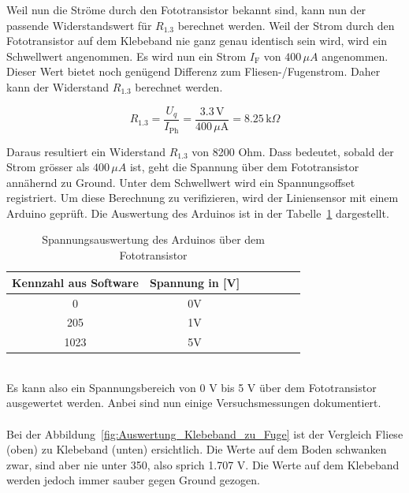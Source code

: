 \documentclass[main.tex]{subfiles} %
\begin{document}
Weil nun die Ströme durch den Fototransistor bekannt sind, kann nun der passende Widerstandswert für $R_{1.3}$ berechnet werden. Weil der Strom
durch den Fototransistor auf dem Klebeband nie ganz genau identisch sein wird, wird ein Schwellwert angenommen. Es wird nun ein Strom $I_{\text{F}}$ von $400 \, \mu A$
angenommen. Dieser Wert bietet noch genügend Differenz zum Fliesen-/Fugenstrom. Daher kann der Widerstand $R_{1.3}$ berechnet werden.

\[
    R_{1.3} = \frac{U_q}{I_{\text{Ph}}} = \frac{3.3 \, \text{V}}{400 \, \mu \text{A}} = 8.25 \, \text{k}\Omega
\]


Daraus resultiert ein Widerstand $R_{1.3}$ von 8200 Ohm. Dass bedeutet, sobald der Strom grösser als $400 \, \mu A$ ist, geht die Spannung über dem
Fototransistor annähernd zu Ground. Unter dem Schwellwert wird ein Spannungsoffset registriert. Um diese Berechnung zu verifizieren, wird der Liniensensor mit
einem Arduino geprüft. Die Auswertung des Arduinos ist in der Tabelle~\ref{tab:Spannungsauswertung_Arduino} dargestellt.
\begin{table}[h]                                    
    \centering
    \begin{tabular}{|c|c|c|c|c|c|c|}                        
        \hline
        \textbf{Kennzahl aus Software} & \textbf{Spannung in [V]}        \\ \hline
        0                      & 0V                                     \\ \hline
        205                    & 1V                                     \\ \hline
        1023                   & 5V                                     \\ \hline

        \end{tabular}
\caption{Spannungsauswertung des Arduinos über dem Fototransistor}
\label{tab:Spannungsauswertung_Arduino}
\end{table}\\

Es kann also ein Spannungsbereich von 0 V bis 5 V über dem Fototransistor ausgewertet werden. Anbei sind nun einige Versuchsmessungen dokumentiert.\\\\


Bei der Abbildung~\ref{fig:Auswertung_Klebeband_zu_Fuge} ist der Vergleich Fliese (oben) zu Klebeband (unten) ersichtlich. Die Werte auf dem Boden schwanken zwar, 
sind aber nie unter 350, also sprich 1.707 V. Die Werte auf dem Klebeband werden jedoch immer sauber gegen Ground gezogen.
\end{document}
